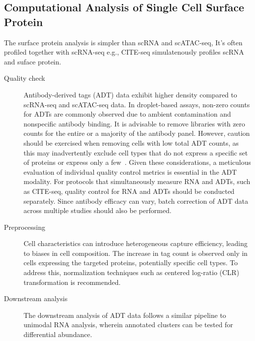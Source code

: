 \subsection{Computational Analysis of Single Cell Surface Protein}
\label{background:sec2:protein}
The surface protein analysis is simpler than scRNA and scATAC-seq, It's often profiled together with scRNA-seq e.g., CITE-seq simulatenously profiles scRNA and suface protein.
\begin{description}
	\item[Quality check] 
	Antibody-derived tags (ADT) data exhibit higher density compared to scRNA-seq and scATAC-seq data. In droplet-based assays, non-zero counts for ADTs are commonly observed due to ambient contamination and nonspecific antibody binding. It is advisable to remove libraries with zero counts for the entire or a majority of the antibody panel. However, caution should be exercised when removing cells with low total ADT counts, as this may inadvertently exclude cell types that do not express a specific set of proteins or express only a few~\citep{amezquita2020adtqc}. Given these considerations, a meticulous evaluation of individual quality control metrics is essential in the ADT modality. For protocols that simultaneously measure RNA and ADTs, such as CITE-seq, quality control for RNA and ADTs should be conducted separately. Since antibody efficacy can vary, batch correction of ADT data across multiple studies should also be performed\citep{zheng2022adtqc}.

	\item[Preprocessing]
	Cell characteristics can introduce heterogeneous capture efficiency, leading to biases in cell composition. The increase in tag count is observed only in cells expressing the targeted proteins, potentially specific cell types\citep{zheng2022adtqc}. To address this, normalization techniques such as centered log-ratio (CLR) transformation is recommended\citep{stoeckius2017simultaneous}.


	\item[Downstream analysis]
	The downstream analysis of ADT data follows a similar pipeline to unimodal RNA analysis, wherein annotated clusters can be tested for differential abundance.
\end{description}

